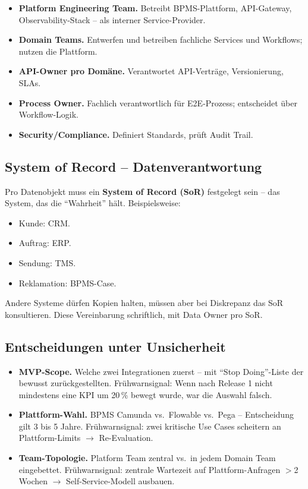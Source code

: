 \documentclass[11pt,a4paper,oneside]{article}
\newcommand{\fachbegriff}[1]{\textbf{#1}}
\begin{document}
\begin{itemize}
  \item \fachbegriff{Platform Engineering Team.} Betreibt BPMS-Plattform, API-Gateway, Observability-Stack -- als interner Service-Provider.
  \item \fachbegriff{Domain Teams.} Entwerfen und betreiben fachliche Services und Workflows; nutzen die Plattform.
  \item \fachbegriff{API-Owner pro Domäne.} Verantwortet API-Verträge, Versionierung, SLAs.
  \item \fachbegriff{Process Owner.} Fachlich verantwortlich für E2E-Prozess; entscheidet über Workflow-Logik.
  \item \fachbegriff{Security/Compliance.} Definiert Standards, prüft Audit Trail.
\end{itemize}

\subsection{System of Record -- Datenverantwortung}

Pro Datenobjekt muss ein \fachbegriff{System of Record (SoR)} festgelegt sein -- das System, das die ``Wahrheit'' hält. Beispielsweise:

\begin{itemize}
  \item Kunde: CRM.
  \item Auftrag: ERP.
  \item Sendung: TMS.
  \item Reklamation: BPMS-Case.
\end{itemize}

Andere Systeme dürfen Kopien halten, müssen aber bei Diskrepanz das SoR konsultieren. Diese Vereinbarung schriftlich, mit Data Owner pro SoR.

\subsection{Entscheidungen unter Unsicherheit}

\begin{itemize}
  \item \textbf{MVP-Scope.} Welche zwei Integrationen zuerst -- mit ``Stop Doing''-Liste der bewusst zurückgestellten. Frühwarnsignal: Wenn nach Release 1 nicht mindestens eine KPI um 20\,\% bewegt wurde, war die Auswahl falsch.
  \item \textbf{Plattform-Wahl.} BPMS Camunda vs.\ Flowable vs.\ Pega -- Entscheidung gilt 3 bis 5 Jahre. Frühwarnsignal: zwei kritische Use Cases scheitern an Plattform-Limits $\rightarrow$ Re-Evaluation.
  \item \textbf{Team-Topologie.} Platform Team zentral vs.\ in jedem Domain Team eingebettet. Frühwarnsignal: zentrale Wartezeit auf Plattform-Anfragen $>$2 Wochen $\rightarrow$ Self-Service-Modell ausbauen.
\end{itemize}
\end{document}
